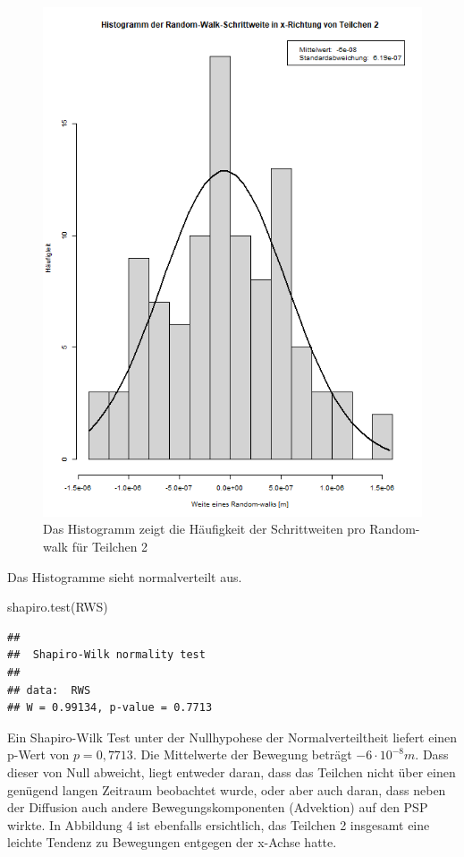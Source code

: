 \documentclass[
  9pt,
]{article}
\newenvironment{Shaded}{\begin{snugshade}}{\end{snugshade}}
\newcommand{\FunctionTok}[1]{\textcolor[rgb]{0.00,0.00,0.00}{#1}}
\newcommand{\NormalTok}[1]{#1}
\begin{document}
\begin{figure}
\centering
\includegraphics[width=\textwidth,height=0.4\textheight]{code/Plots/Teilchen2.png}
\caption{Das Histogramm zeigt die Häufigkeit der Schrittweiten pro
Random-walk für Teilchen 2}
\end{figure}

Das Histogramme sieht normalverteilt aus.

\begin{Shaded}
\begin{Highlighting}[]
\FunctionTok{shapiro.test}\NormalTok{(RWS)}
\end{Highlighting}
\end{Shaded}

\begin{verbatim}
## 
##  Shapiro-Wilk normality test
## 
## data:  RWS
## W = 0.99134, p-value = 0.7713
\end{verbatim}

Ein Shapiro-Wilk Test unter der Nullhypohese der Normalverteiltheit
liefert einen p-Wert von \(p = 0,7713\). Die Mittelwerte der Bewegung
beträgt \(-6\cdot10^{-8}m\). Dass dieser von Null abweicht, liegt
entweder daran, dass das Teilchen nicht über einen genügend langen
Zeitraum beobachtet wurde, oder aber auch daran, dass neben der
Diffusion auch andere Bewegungskomponenten (Advektion) auf den PSP
wirkte. In Abbildung 4 ist ebenfalls ersichtlich, das Teilchen 2
insgesamt eine leichte Tendenz zu Bewegungen entgegen der x-Achse hatte.
\end{document}
